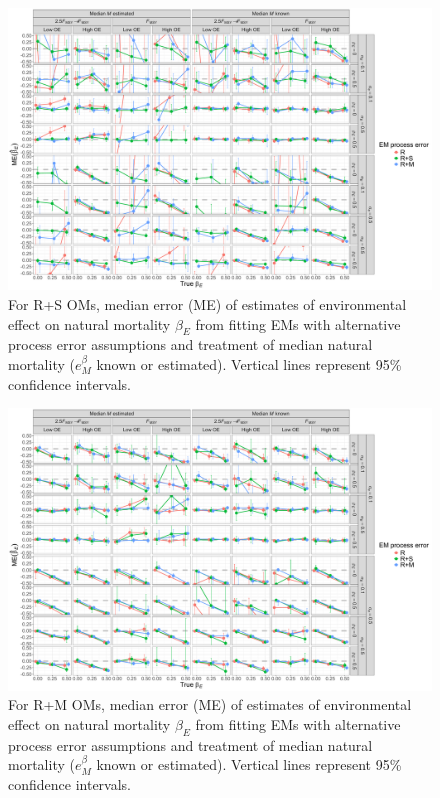 \documentclass[
  12pt,
]{article}
\begin{document}
\begin{landscape}
\begin{figure}
\begin{center}
\includegraphics[height = \textheight]{beta_E_bias_RSom}
\end{center}
\caption{For R+S OMs, median error (ME) of estimates of environmental effect on natural mortality $\beta_E$ from fitting EMs with alternative process error assumptions and treatment of median natural mortality ($e^\beta_M$ known or estimated). Vertical lines represent 95\% confidence intervals.}\label{beta_E_bias_RSom}
\end{figure}
\end{landscape}

\begin{landscape}
\begin{figure}
\begin{center}
\includegraphics[height = \textheight]{beta_E_bias_RMom}
\end{center}
\caption{For R+M OMs, median error (ME) of estimates of environmental effect on natural mortality $\beta_E$ from fitting EMs with alternative process error assumptions and treatment of median natural mortality ($e^\beta_M$ known or estimated). Vertical lines represent 95\% confidence intervals.}\label{beta_E_bias_RMom}
\end{figure}
\end{landscape}
\end{document}
